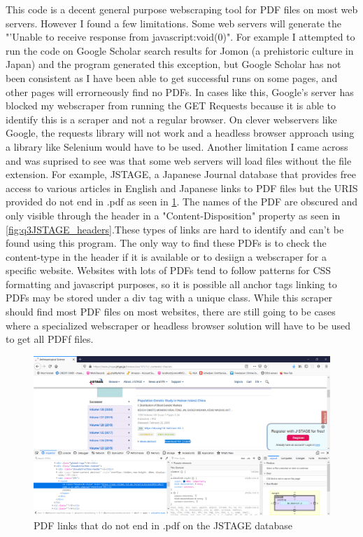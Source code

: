 \documentclass[12pt]{article}
\begin{document}
This code is a decent general purpose webscraping tool for PDF files on most web servers. However I found a few limitations. Some web servers will generate the "'Unable to receive response from  javascript:void(0)". For example I attempted to run the code on Google Scholar search results for Jomon (a prehistoric culture in Japan) \cite{googleScholarJomon} and the program generated this exception, but Google Scholar has not been consistent as I have been able to get successful runs on some pages, and other pages will errorneously find no PDFs. In cases like this, Google's server has blocked my webscraper from running the GET Requests because it is able to identify this is a scraper and not a regular browser. On clever webservers like Google, the requests library will not work and a headless browser approach using a library like Selenium would have to be used. Another limitation I came across and was suprised to see was that some web servers will load files without the file extension. For example, JSTAGE, a Japanese Journal database that provides free access to various articles in English and Japanese links to PDF files but the URIS provided do not end in .pdf as seen in \ref{fig:q3JSTAGE_pdfs}. The names of the PDF are obscured and only visible through the header in a "Content-Disposition" property as seen in \ref{fig:q3JSTAGE_headers}.These types of links are hard to identify and can't be found using this program. The only way to find these PDFs is to check the content-type in the header if it is available or to desiign a webscraper for a specific website. Websites with lots of PDFs tend to follow patterns for CSS formatting and javascript purposes, so it is possible all anchor tags linking to PDFs may be stored under a div tag with a unique class. While this scraper should find most PDF files on most websites, there are still going to be cases where a specialized webscraper or headless browser solution will have to be used to get all PDFf files. 

\begin{figure}[H]
    \centering
    \includegraphics[trim=0 60 10 20, clip, width=\textwidth] {Q3/jstage_missingExtension.png}
    \caption{PDF links that do not end in .pdf on the JSTAGE database}
    \label{fig:q3JSTAGE_pdfs}
\end{figure}
\end{document}
